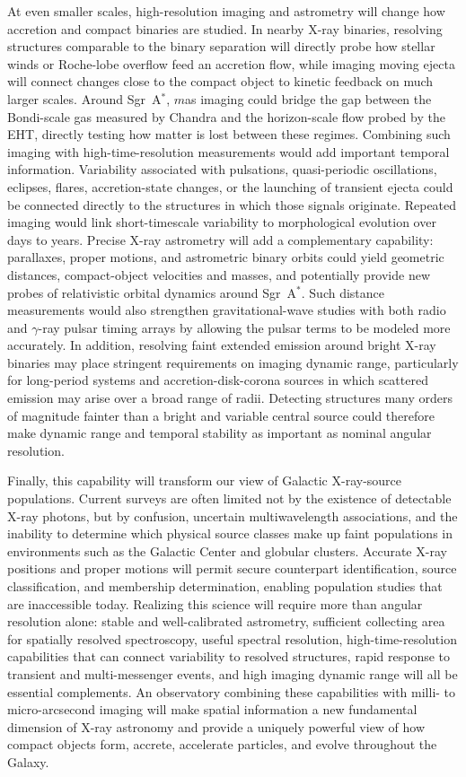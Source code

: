 \documentclass{article}
\begin{document}
At even smaller scales, high-resolution imaging and astrometry will change how accretion and compact binaries are studied. In nearby X-ray binaries, resolving structures comparable to the binary separation will directly probe how stellar winds or Roche-lobe overflow feed an accretion flow, while imaging moving ejecta will connect changes close to the compact object to kinetic feedback on much larger scales. Around Sgr~A$^*$, $m$as imaging could bridge the gap between the Bondi-scale gas measured by Chandra and the horizon-scale flow probed by the EHT, directly testing how matter is lost between these regimes. Combining such imaging with high-time-resolution measurements would add important temporal information. Variability associated with pulsations, quasi-periodic oscillations, eclipses, flares, accretion-state changes, or the launching of transient ejecta could be connected directly to the structures in which those signals originate. Repeated imaging would link short-timescale variability to morphological evolution over days to years. Precise X-ray astrometry will add a complementary capability: parallaxes, proper motions, and astrometric binary orbits could yield geometric distances, compact-object velocities and masses, and potentially provide new probes of relativistic orbital dynamics around Sgr~A$^*$. Such distance measurements would also strengthen gravitational-wave studies with both radio and $\gamma$-ray pulsar timing arrays by allowing the pulsar terms to be modeled more accurately. In addition, resolving faint extended emission around bright X-ray binaries may place stringent requirements on imaging dynamic range, particularly for long-period systems and accretion-disk-corona sources in which scattered emission may arise over a broad range of radii. Detecting structures many orders of magnitude fainter than a bright and variable central source could therefore make dynamic range and temporal stability as important as nominal angular resolution.

Finally, this capability will transform our view of Galactic X-ray-source populations. Current surveys are often limited not by the existence of detectable X-ray photons, but by confusion, uncertain multiwavelength associations, and the inability to determine which physical source classes make up faint populations in environments such as the Galactic Center and globular clusters. Accurate X-ray positions and proper motions will permit secure counterpart identification, source classification, and membership determination, enabling population studies that are inaccessible today. Realizing this science will require more than angular resolution alone: stable and well-calibrated astrometry, sufficient collecting area for spatially resolved spectroscopy, useful spectral resolution, high-time-resolution capabilities that can connect variability to resolved structures, rapid response to transient and multi-messenger events, and high imaging dynamic range will all be essential complements. An observatory combining these capabilities with milli- to micro-arcsecond imaging will make spatial information a new fundamental dimension of X-ray astronomy and provide a uniquely powerful view of how compact objects form, accrete, accelerate particles, and evolve throughout the Galaxy.

\small


\end{document}
